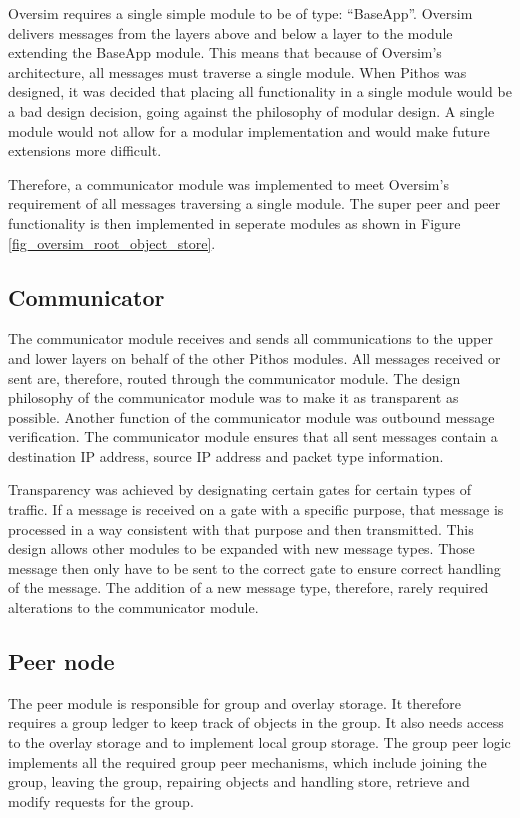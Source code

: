 Oversim requires a single simple module to be of type: ``BaseApp''. Oversim delivers messages from the layers above and below a layer to the module extending the BaseApp module. This means that because of Oversim's architecture, all messages must traverse a single module. When Pithos was designed, it was decided that placing all functionality in a single module would be a bad design decision, going against the philosophy of modular design. A single module would not allow for a modular implementation and would make future extensions more difficult.

Therefore, a communicator module was implemented to meet Oversim's requirement of all messages traversing a single module. The super peer and peer functionality is then implemented in seperate modules as shown in Figure \ref{fig_oversim_root_object_store}.

\subsection{Communicator}

The communicator module receives and sends all communications to the upper and lower layers on behalf of the other Pithos modules. All messages received or sent are, therefore, routed through the communicator module. The design philosophy of the communicator module was to make it as transparent as possible. Another function of the communicator module was outbound message verification. The communicator module ensures that all sent messages contain a destination IP address, source IP address and packet type information.

Transparency was achieved by designating certain gates for certain types of traffic. If a message is received on a gate with a specific purpose, that message is processed in a way consistent with that purpose and then transmitted. This design allows other modules to be expanded with new message types. Those message then only have to be sent to the correct gate to ensure correct handling of the message. The addition of a new message type, therefore, rarely required alterations to the communicator module.

\subsection{Peer node}

The peer module is responsible for group and overlay storage. It therefore requires a group ledger to keep track of objects in the group. It also needs access to the overlay storage and to implement local group storage. The group peer logic implements all the required group peer mechanisms, which include joining the group, leaving the group, repairing objects and handling store, retrieve and modify requests for the group.

